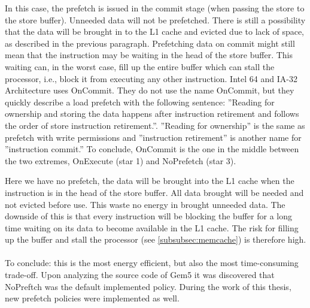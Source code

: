  In this case, the prefetch is issued in the commit stage (when passing
the store to the store buffer). Unneeded data will not be
prefetched. There is still a possibility that the data will be brought in to the L1 cache and evicted
due to lack of space, as described in the previous paragraph. Prefetching
data on commit might still mean that the instruction may be waiting in the head
of the store buffer. This waiting can, in the worst case, fill up the entire buffer which can stall the
processor, i.e., block it from executing any other instruction. Intel 64 and IA-32 Architecture \cite{ONCO} uses OnCommit. They do not use the name OnCommit, but they
quickly describe a load prefetch with the following sentence: ”Reading for ownership
and storing the data happens after instruction retirement and follows the order of
store instruction retirement.”. ”Reading for ownership” is the same as prefetch with
write permissions and ”instruction retirement” is another name for ”instruction commit.” 
To conclude, OnCommit is the one in the middle between the two extremes,
OnExecute (star 1) and NoPrefetch (star 3).

 Here we have no prefetch, the data will be brought into the
L1 cache when the instruction is in the head of the store buffer. All data brought will be
needed and not evicted before use. This waste no energy in brought unneeded data. The downside of this is that every
instruction will be blocking the buffer for a long time waiting on its data to become
available in the L1 cache. The risk for filling up the buffer and stall the processor
(see \ref{subsubsec:memcache}) is therefore high.
\\ \\
To conclude: this is the most energy efficient, but also the most time-consuming trade-off. Upon analyzing the source code of Gem5 \cite{gem5} it was discovered
that NoPreftch was the default implemented policy. During the work of this thesis, new prefetch policies were implemented as well.


